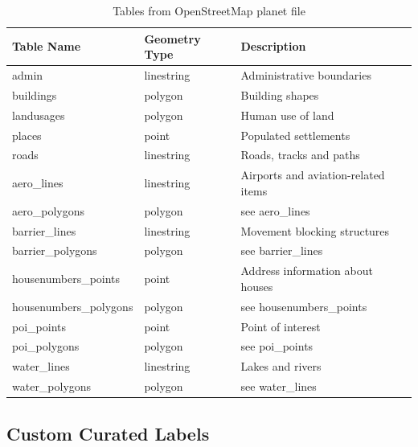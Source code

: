 \begin{table}[H]
    \begin{tabular}{lll}
    \hline
    Table Name            & Geometry Type & Description \\
    \hline                                          
    admin                  & linestring    & Administrative boundaries \\
    buildings              & polygon       & Building shapes                            \\
    landusages             & polygon       & Human use of land \\
    places                 & point         & Populated settlements                      \\
    roads                  & linestring    & Roads, tracks and paths          \\
    aero\_lines            & linestring    & Airports and aviation-related items        \\
    aero\_polygons         & polygon       & see aero\_lines                            \\
    barrier\_lines         & linestring    & Movement blocking structures   \\
    barrier\_polygons      & polygon       & see barrier\_lines                         \\
    housenumbers\_points   & point         & Address information about houses \\
    housenumbers\_polygons & polygon       & see housenumbers\_points                   \\
    poi\_points            & point         & Point of interest                          \\
    poi\_polygons          & polygon       & see poi\_points                            \\
    water\_lines           & linestring    & Lakes and rivers                           \\
    water\_polygons        & polygon       & see water\_lines                           \\
    \end{tabular}
    \caption{Tables from OpenStreetMap planet file}
\end{table}

\subsection{Custom Curated Labels}

